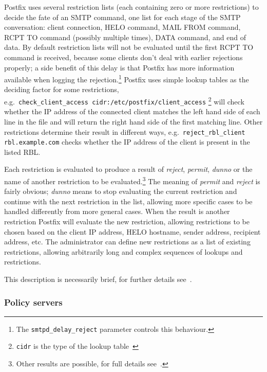 \documentclass[a4paper,12pt,draft]{article}
\begin{document}
Postfix uses several restriction lists (each containing zero or more
restrictions) to decide the fate of an SMTP command, one list for each
stage of the SMTP conversation: client connection, HELO command, MAIL FROM
command, RCPT TO command (possibly multiple times), DATA command, and end
of data.  By default restriction lists will not be evaluated until the
first RCPT TO command is received, because some clients don't deal with
earlier rejections properly; a side benefit of this delay is that Postfix
has more information available when logging the rejection.\footnote{The
\texttt{smtpd\_delay\_reject} parameter controls this behaviour.}  Postfix
uses simple lookup tables as the deciding factor for some restrictions,
e.g.\ \texttt{check\_client\_access~cidr:/etc/postfix/client\_access}
\footnote{\texttt{cidr} is the type of the lookup table~\cite{cidr_table}}
will check whether the IP address of the connected client matches the left
hand side of each line in the file and will return the right hand side of
the first matching line.  Other restrictions determine their result in
different ways, e.g.\ \texttt{reject\_rbl\_client rbl.example.com} checks
whether the IP address of the client is present in the listed RBL\@.

Each restriction is evaluated to produce a result of \textit{reject},
\textit{permit}, \textit{dunno\/} or the name of another restriction to be
evaluated.\footnote{Other results are possible, for full details
see~\cite{smtpd_access_readme, smtpd_per_user_control, policy-servers}.}
The meaning of \textit{permit\/} and \textit{reject\/} is fairly obvious;
\textit{dunno\/} means to stop evaluating the current restriction and
continue with the next restriction in the list, allowing more specific
cases to be handled differently from more general cases.  When the result
is another restriction Postfix will evaluate the new restriction, allowing
restrictions to be chosen based on the client IP address, HELO hostname,
sender address, recipient address, etc.  The administrator can define new
restrictions as a list of existing restrictions, allowing arbitrarily long
and complex sequences of lookups and restrictions.

This description is necessarily brief, for further details
see~\cite{smtpd_access_readme, smtpd_per_user_control, policy-servers}.


\subsubsection{Policy servers}
\end{document}
